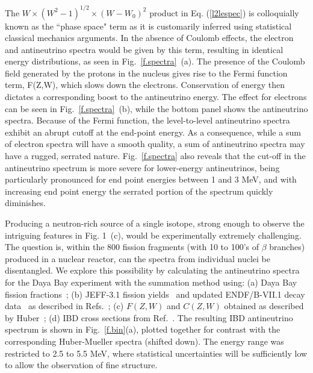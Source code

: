 \documentclass[twocolumn,amsmath,amssymb,10pt,superscriptaddress,a4paper,letterpaper,fleqn]{revtex4-1}
\begin{document}
The $W \times (W^2-1)^{1/2} \times (W-W_0)^2 $ product in Eq. (\ref{l2lespec}) is colloquially known as the ``phase space" term as it is customarily inferred using statistical classical mechanics 
arguments.   In the absence of Coulomb effects, the electron and antineutrino spectra would be given by this term, resulting in identical energy distributions, as seen in Fig.~\ref{f.spectra}~(a).
The presence of the Coulomb field generated by the protons in the nucleus gives rise to the Fermi function term, F(Z,W), which slows down the electrons. 
Conservation of energy then dictates a corresponding boost to the antineutrino energy. 
The effect for
electrons can be seen in Fig.~\ref{f.spectra}~(b), while the bottom panel shows the antineutrino spectra.   
Because of the Fermi function, the level-to-level antineutrino spectra exhibit an abrupt cutoff at
the end-point energy.  As a consequence, while a sum of electron spectra will have a smooth quality, a sum of antineutrino spectra may have a rugged, serrated nature.
Fig.~\ref{f.spectra} also reveals that the cut-off in the antineutrino spectrum is more severe for lower-energy antineutrinos, being particularly pronounced for end point energies between 1 and 3 MeV, 
and with increasing end point energy the serrated portion of the spectrum quickly diminishes.  

Producing a neutron-rich source  of a single isotope, strong enough to observe the intriguing features  in Fig. 1~(c), would be experimentally extremely challenging. The question is, within the 800 fission fragments  
(with 10 to 100's of $\beta$ branches) produced in a nuclear reactor, can the spectra from individual nuclei be disentangled. 
We explore this possibility by calculating the antineutrino spectra for the Daya Bay experiment with the
summation method using:
(a) Daya Bay fission fractions~\cite{dayabay16};
(b) JEFF-3.1 fission yields~\cite{jeff31} and updated  ENDF/B-VII.1 decay data~\cite{e71} 
as described in Refs.~\cite{sonzogni15,sonzogni16};
(c) $F(Z,W)$  and $C(Z,W)$ obtained as described by Huber~\cite{huber11};
(d) IBD cross sections from Ref.~\cite{xs}. 
The resulting IBD antineutrino spectrum is shown in Fig.~\ref{f.bin}(a), 
plotted together for contrast with the corresponding Huber-Mueller spectra (shifted down).   The energy range was restricted
to 2.5 to 5.5 MeV, where statistical uncertainties will be sufficiently low to allow the observation of fine structure.
\end{document}
